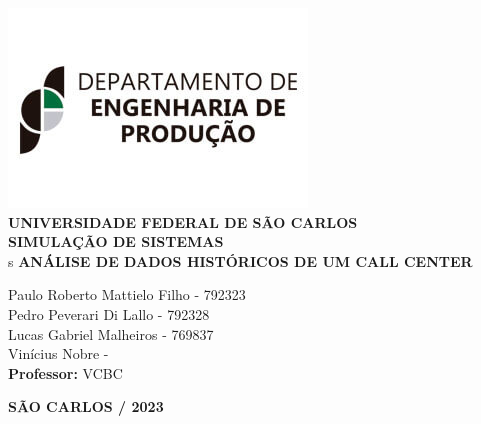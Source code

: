 \justifying %
\onehalfspacing %
\setlength{\parindent}{0cm}  %
\renewcommand*\familydefault{\rmdefault}
\thispagestyle{empty}
\begin{center}
\includegraphics[scale=0.6]{capa/logo-dep.jpg}\\
\vspace*{.8cm}
{\huge \textbf{UNIVERSIDADE FEDERAL DE SÃO CARLOS}}\\
\vspace*{.8cm}
{\Larsge \textbf{SIMULAÇÃO DE SISTEMAS}}\\s
\vspace*{3cm}
{\Large \textbf{ANÁLISE DE DADOS HISTÓRICOS DE UM CALL CENTER}}\\
\vspace*{4.5cm}
\begin{flushright}
    \onehalfspacing
    {\Large  Paulo Roberto Mattielo Filho - 792323}\\
    {\Large  Pedro Peverari Di Lallo - 792328}\\
    {\Large  Lucas Gabriel Malheiros - 769837}\\
    {\Large  Vinícius Nobre - }\\
    \vspace*{.3cm}
    {\Large \textbf{Professor:}}
    {\Large VCBC}\\
\end{flushright}
\vspace*{\fill}
{\large \bf SÃO CARLOS / 2023}
\end{center}


